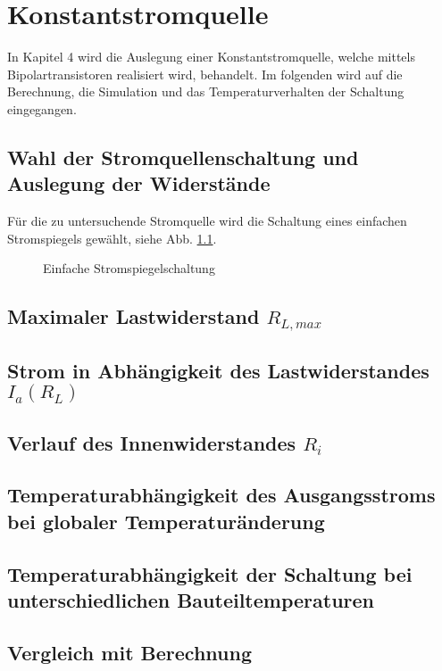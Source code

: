 \def\figpath{tex/4_Konstantstromquelle/pictures}
\graphicspath{{tex/4_Konstantstromquelle/pictures/}}

\chapter{Konstantstromquelle}
In Kapitel 4 wird die Auslegung einer Konstantstromquelle, welche mittels Bipolartransistoren realisiert wird, behandelt. Im folgenden wird auf die Berechnung, die Simulation und das Temperaturverhalten der Schaltung eingegangen. 

\section{Wahl der Stromquellenschaltung und Auslegung der Widerstände}
Für die zu untersuchende Stromquelle wird die Schaltung eines einfachen Stromspiegels gewählt, siehe Abb. \ref{fig_Kap4_01:Stromspiegel01}. 

\begin{figure}[H]
	\centering
	\def\svgwidth{0.6\textwidth}
	
	\caption{Einfache Stromspiegelschaltung} 
	\label{fig_Kap4_01:Stromspiegel01} 
\end{figure}



\section{Maximaler Lastwiderstand $R_{L,max}$}

\section{Strom in Abhängigkeit des Lastwiderstandes $I_a(R_L)$}

\section{Verlauf des Innenwiderstandes $R_i$}

\section{Temperaturabhängigkeit des Ausgangsstroms bei globaler Temperaturänderung}

\section{Temperaturabhängigkeit der Schaltung bei unterschiedlichen Bauteiltemperaturen}

\section{Vergleich mit Berechnung}
